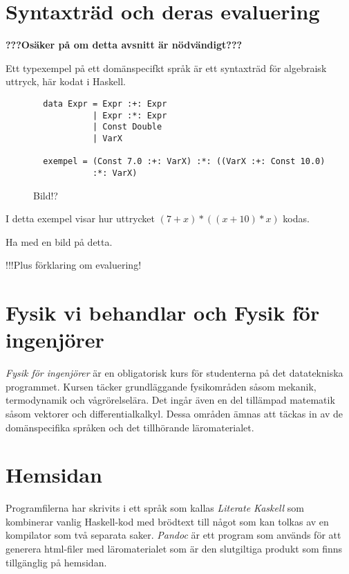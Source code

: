 \section{Syntaxträd och deras evaluering}

\textbf{???Osäker på om detta avsnitt är nödvändigt???}



Ett typexempel på ett domänspecifkt språk är ett syntaxträd för algebraisk uttryck, här kodat i Haskell.

\begin{figure}
  \begin{lstlisting}
  data Expr = Expr :+: Expr
            | Expr :*: Expr
            | Const Double
            | VarX

  exempel = (Const 7.0 :+: VarX) :*: ((VarX :+: Const 10.0)
            :*: VarX)
  \end{lstlisting}
  \caption{Bild!?}
  \label{fig:syntax_exempel}
\end{figure}

I detta exempel visar hur uttrycket $(7+x)*((x+10)*x)$ kodas.

Ha med en bild på detta.

!!!Plus förklaring om evaluering!


\section{Fysik vi behandlar och Fysik för ingenjörer}

\begin{draft}
  \emph{Fysik för ingenjörer} är en obligatorisk kurs för studenterna på det
  datatekniska programmet. Kursen täcker grundläggande fysikområden såsom
  mekanik, termodynamik och vågrörelselära. Det ingår även en del tillämpad
  matematik såsom vektorer och differentialkalkyl. Dessa områden ämnas att
  täckas in av de domänspecifika språken och det tillhörande läromaterialet.
\end{draft}

\section{Hemsidan}
\begin{draft}
  Programfilerna har skrivits i ett språk som kallas \textit{Literate Kaskell}
  som kombinerar vanlig Haskell-kod med brödtext till något som kan tolkas av en
  kompilator som två separata saker. \textit{Pandoc} är ett program som används
  för att generera html-filer med läromaterialet som är den slutgiltiga produkt
  som finns tillgänglig på hemsidan.
\end{draft}
